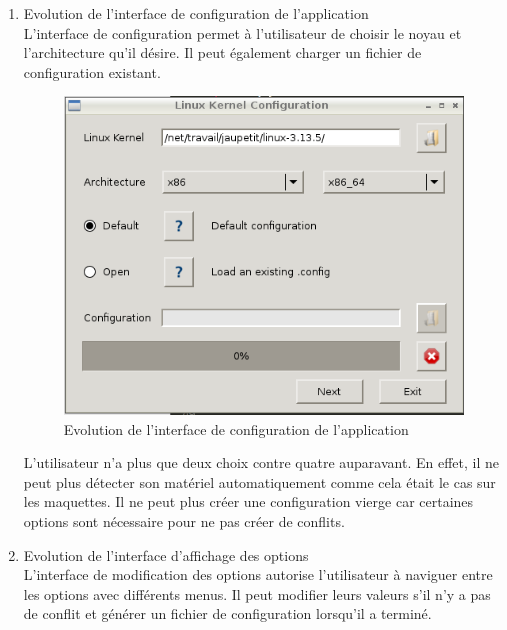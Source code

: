 \documentclass[16pts]{report}
\begin{document}
\begin{enumerate}

	\item Evolution de l'interface de configuration de l'application
	\\

	L'interface de configuration permet à l'utilisateur de choisir le noyau 
	et l'architecture qu'il désire. Il peut également charger un fichier de 
	configuration existant.

	\begin{figure}[H]
		\includegraphics[scale=0.7]{../illustrations/screen_configuration_interface.png}
		\centering
		\caption{Evolution de l'interface de configuration de l'application}
		\label{fig:Evo_config}
	\end{figure}

	L'utilisateur n'a plus que deux choix contre quatre auparavant. En effet, 
	il ne peut plus détecter son matériel automatiquement comme cela était 
	le cas sur les maquettes. Il ne peut plus créer une configuration vierge 
	car certaines options sont nécessaire pour ne pas créer de conflits.
	\\

	\pagebreak	

	\item Evolution de l'interface d'affichage des options
	\\

	L'interface de modification des options autorise l'utilisateur à naviguer 
	entre les options avec différents menus. Il peut modifier leurs valeurs 
	s'il n'y a pas de conflit et générer un fichier de configuration lorsqu'il 
	a terminé.


\end{enumerate}
\end{document}
